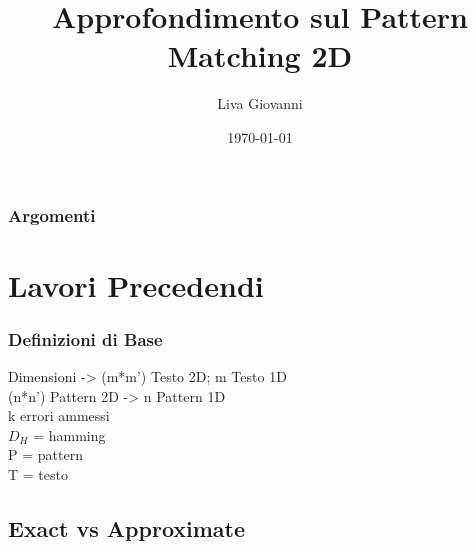 \documentclass{beamer}
\title[Two-dimensional Pattern Matching]{Approfondimento sul Pattern Matching 2D} %
\author{Liva Giovanni} %
\institute[Udine] %
{
Università di Udine \\ %
\medskip
}
\date{\today} %
\begin{document}
\begin{frame}
\titlepage %
\end{frame}

\begin{frame}
\frametitle{Argomenti} %
\tableofcontents %
\end{frame}


\section{Lavori Precedendi}
\begin{frame}
\frametitle{Definizioni di Base}
Dimensioni -> (m*m') Testo 2D; m Testo 1D\\
(n*n') Pattern 2D -> n Pattern 1D\\
k errori ammessi\\
$D_H$ = hamming\\
P = pattern\\
T = testo\\
\end{frame}
\subsection{Exact vs Approximate}
\end{document}
